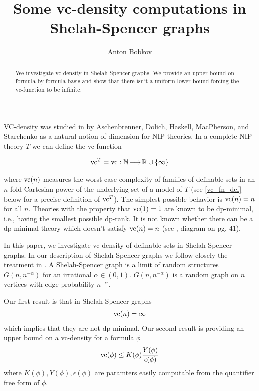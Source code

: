 \documentclass{amsart}
\title{Some vc-density computations in Shelah-Spencer graphs}
\author{Anton Bobkov}
\newcommand{\curly}[1]{\left\{#1\right\}}
\begin{document}
\begin{abstract}
  We investigate vc-density in Shelah-Spencer graphs.
  We provide an upper bound on formula-by-formula basis and show that there isn't a uniform lower bound forcing the vc-function to be infinite.
\end{abstract}

\maketitle


VC-density was studied in \cite{density} by Aschenbrenner, Dolich, Haskell, MacPherson, and Starchenko as a natural notion of dimension for NIP theories.
In a complete NIP theory $T$ we can define the vc-function

\begin{align*}
  \vc^T = \vc : \N \arr \R \cup \curly{\infty}
\end{align*}

where $\operatorname{vc}(n)$ measures the worst-case complexity of families of definable sets in an $n$-fold Cartesian power of the underlying set of a model of $T$
(see \ref{vc_fn_def} below for a precise definition of $\operatorname{vc}^T$).
The simplest possible behavior is $\operatorname{vc}(n) = n$ for all $n$. Theories with the property that $\operatorname{vc}(1) = 1$ are known to be dp-minimal, i.e., having the smallest possible dp-rank. It is not known whether there can be a dp-minimal theory which doesn't satisfy $\operatorname{vc}(n)=n$
(see \cite{density}, diagram on pg. 41).

In this paper, we investigate vc-density of definable sets in Shelah-Spencer graphs.
In our description of Shelah-Spencer graphs we follow closely the treatment in \cite{laskowski}.
A Shelah-Spencer graph is a limit of random structures $G(n, n^{-\alpha})$ for an irrational $\alpha \in (0,1)$.
$G(n, n^{-\alpha})$ is a random graph on $n$ vertices with edge probability $n^{-\alpha}$.

Our first result is that in Shelah-Spencer graphs
\begin{align*}
  \operatorname{vc}(n) = \infty
\end{align*}
which implies that they are not dp-minimal.
Our second result is providing an upper bound on a vc-density for a formula $\phi$
\begin{align*}
  \operatorname{vc}(\phi) \leq K(\phi) \frac{Y(\phi)}{\epsilon(\phi)}    
\end{align*}
where $K(\phi), Y(\phi), \epsilon(\phi)$ are paramters easily computable from the quantifier free form of $\phi$.
\end{document}
